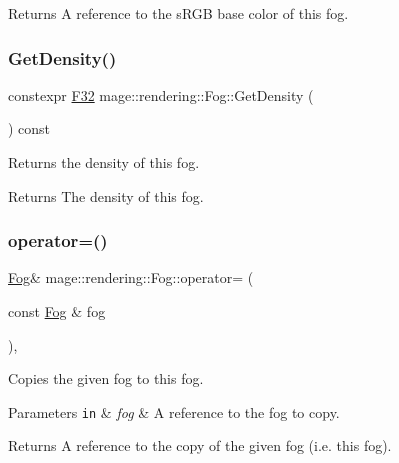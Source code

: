 \begin{DoxyReturn}{Returns}
A reference to the s\+R\+GB base color of this fog. 
\end{DoxyReturn}
\mbox{\label{classmage_1_1rendering_1_1_fog_ac99a5479a39027723807296c49fdfbc8}} 
\subsubsection{\texorpdfstring{Get\+Density()}{GetDensity()}}
{\footnotesize\ttfamily constexpr \mbox{\hyperlink{namespacemage_aa97e833b45f06d60a0a9c4fc22ae02c0}{F32}} mage\+::rendering\+::\+Fog\+::\+Get\+Density (\begin{DoxyParamCaption}{ }\end{DoxyParamCaption}) const\hspace{0.3cm}{\ttfamily [noexcept]}}

Returns the density of this fog.

\begin{DoxyReturn}{Returns}
The density of this fog. 
\end{DoxyReturn}
\mbox{\label{classmage_1_1rendering_1_1_fog_a79bb3e3b7cbae494ae6f4d7f84a61aae}} 
\subsubsection{\texorpdfstring{operator=()}{operator=()}\hspace{0.1cm}{\footnotesize\ttfamily [1/2]}}
{\footnotesize\ttfamily \mbox{\hyperlink{classmage_1_1rendering_1_1_fog}{Fog}}\& mage\+::rendering\+::\+Fog\+::operator= (\begin{DoxyParamCaption}\item[{const \mbox{\hyperlink{classmage_1_1rendering_1_1_fog}{Fog}} \&}]{fog }\end{DoxyParamCaption})\hspace{0.3cm}{\ttfamily [default]}, {\ttfamily [noexcept]}}

Copies the given fog to this fog.


\begin{DoxyParams}[1]{Parameters}
\mbox{\tt in}  & {\em fog} & A reference to the fog to copy. \\
\hline
\end{DoxyParams}
\begin{DoxyReturn}{Returns}
A reference to the copy of the given fog (i.\+e. this fog). 
\end{DoxyReturn}
\mbox{\label{classmage_1_1rendering_1_1_fog_a60a4ed93bba16c6acfec807c0e753b22}} 
